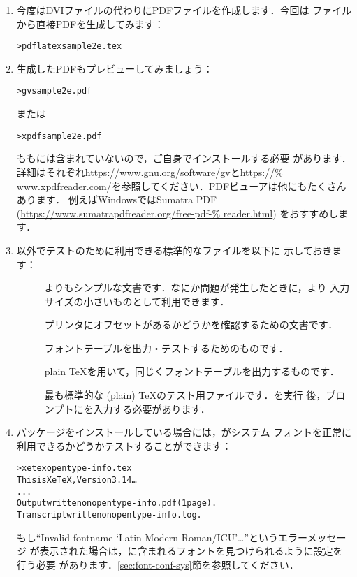 \documentclass[uplatex,dvipdfmx,tombow]{jsarticle}
\begin{document}
\begin{enumerate}
\item 今度はDVIファイルの代わりにPDFファイルを作成します．今回は%
ファイルから直接PDFを生成してみます：
%
\begin{alltt}
> pdflatex sample2e.tex
\end{alltt}

\item 生成したPDFもプレビューしてみましょう：
%
\begin{alltt}
> gv sample2e.pdf
\end{alltt}
%
または
%
\begin{alltt}
> xpdf sample2e.pdf
\end{alltt}
%
もも\TL には含まれていないので，ご自身でインストールする必要
があります．詳細はそれぞれ\url{https://www.gnu.org/software/gv}と\url{https://%
www.xpdfreader.com/}を参照してください．PDFビューアは他にもたくさんあります．
例えばWindowsではSumatra PDF (\url{https://www.sumatrapdfreader.org/free-pdf-%
reader.html}) をおすすめします．

\item {}以外でテストのために利用できる標準的なファイルを以下に
示しておきます：
%
\begin{description}
\item []
よりもシンプルな文書です．なにか問題が発生したときに，より
入力サイズの小さいものとして利用できます．

\item []
プリンタにオフセットがあるかどうかを確認するための文書です．

\item []
フォントテーブルを出力・テストするためのものです．

\item []
plain \TeX を用いて，同じくフォントテーブルを出力するものです．

\item []
最も標準的な (plain) \TeX のテスト用ファイルです．を実行
後，\code{*}プロンプトにを入力する必要があります．
\end{description}

\item {}パッケージをインストールしている場合には，\XeTeX がシステム
フォントを正常に利用できるかどうかテストすることができます：
%
\begin{alltt}
> xetex opentype-info.tex
This is XeTeX, Version 3.14\dots
...
Output written on opentype-info.pdf (1 page).
Transcript written on opentype-info.log.
\end{alltt}
%
もし``Invalid fontname `Latin Modern Roman/ICU'\dots''というエラーメッセージ
が表示された場合は，\TL に含まれるフォントを見つけられるように設定を行う必要
があります．\ref{sec:font-conf-sys}節を参照してください．
\end{enumerate}
\end{document}

